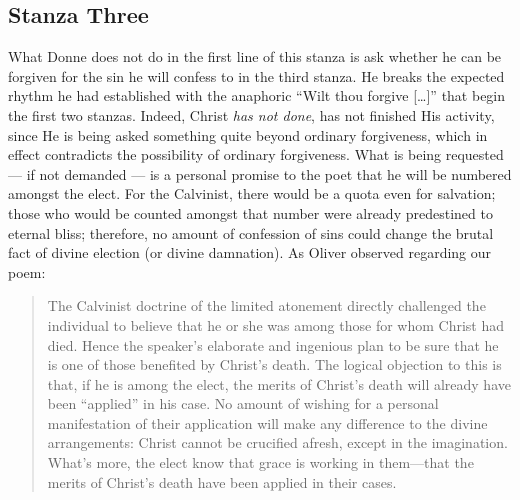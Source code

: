 \begin{paper}
\subsection{Stanza Three}

What Donne does not do in the first line of this stanza is ask whether
he can be forgiven for the sin he will confess to in the third stanza.
He breaks the expected rhythm he had established with the anaphoric
``Wilt thou forgive {[}\ldots{}{]}'' that begin the first two stanzas. Indeed,
Christ \emph{has not done}, has not finished His activity, since He is
being asked something quite beyond ordinary forgiveness, which in effect
contradicts the possibility of ordinary forgiveness. What is being
requested --- if not demanded --- is a personal promise to the poet that
he will be numbered amongst the elect. For the Calvinist, there would be
a quota even for salvation; those who would be counted amongst that
number were already predestined to eternal bliss; therefore, no amount
of confession of sins could change the brutal fact of divine election
(or divine damnation). As Oliver observed regarding our poem:

\begin{quote}
The Calvinist doctrine of the limited atonement directly challenged the
individual to believe that he or she was among those for whom Christ had
died. Hence the speaker's elaborate and ingenious plan to be sure that
he is one of those benefited by Christ's death. The logical objection to
this is that, if he is among the elect, the merits of Christ's death
will already have been ``applied'' in his case. No amount of wishing for
a personal manifestation of their application will make any difference
to the divine arrangements: Christ cannot be crucified afresh, except in
the imagination. What's more, the elect know that grace is working in
them---that the merits of Christ's death have been applied in their
cases.
\begin{flushright}
\citep[90]{oliver_donnes_1997} 
\end{flushright}
\end{quote}


\end{paper}
